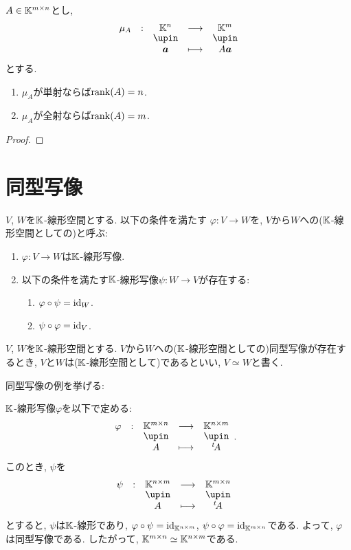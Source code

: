 \begin{prop}
$A\in\mathbb{K}^{m\times n}$とし,
\begin{align*}
\shazo{\mu_A}{\KK^n}{\KK^m}
{\aaa}{A\aaa}
\end{align*}
とする.
\begin{enumerate}
\item $\mu_A$が単射ならば$\operatorname{rank}(A)=n$.
\item $\mu_A$が全射ならば$\operatorname{rank}(A)=m$.
\end{enumerate}
\end{prop}
\begin{proof}\end{proof}

\section{同型写像}
\label{sec:iso:def}

\begin{definition}
  $V$, $W$を$\mathbb{K}$-線形空間とする.
  以下の条件を満たす
  $\varphi\colon V\to W$を,
  $V$から$W$への($\mathbb{K}$-線形空間としての)と呼ぶ:
  \begin{enumerate}
  \item $\varphi\colon V\to W$は$\mathbb{K}$-線形写像.
  \item 以下の条件を満たす$\mathbb{K}$-線形写像$\psi\colon W \to V$が存在する:
    \begin{enumerate}
      \item $\varphi\circ \psi=\operatorname{id}_W$.
      \item $\psi\circ \varphi=\operatorname{id}_V$.
    \end{enumerate}
  \end{enumerate}
\end{definition}
\begin{definition}
  $V$, $W$を$\mathbb{K}$-線形空間とする.
  $V$から$W$への($\mathbb{K}$-線形空間としての)同型写像が存在するとき,
  $V$と$W$は($\mathbb{K}$-線形空間として)であるといい,  
  $V\simeq W$と書く.
\end{definition}

同型写像の例を挙げる:
\begin{example}
  $\mathbb{K}$-線形写像$\varphi$を以下で定める:
  \begin{align*}
    &\shazo{\varphi}{\KK^{m\times n}}{\KK^{n\times m}}{A}{\transposed{A}}.
  \end{align*}
  このとき,
  $\psi$を
  \begin{align*}
    &\shazo{\psi}{\KK^{n\times m}}{\KK^{m\times n}}{A}{\transposed{A}}
  \end{align*}
  とすると,
  $\psi$は$\mathbb{K}$-線形であり, $\varphi\circ \psi=\operatorname{id}_{\mathbb{K}^{n\times m}}$, $\psi\circ\varphi=\operatorname{id}_{\mathbb{K}^{m\times n}}$である.
  よって, $\varphi$は同型写像である.
  したがって, $\mathbb{K}^{m\times n}\simeq\mathbb{K}^{n\times m}$である.
\end{example}



